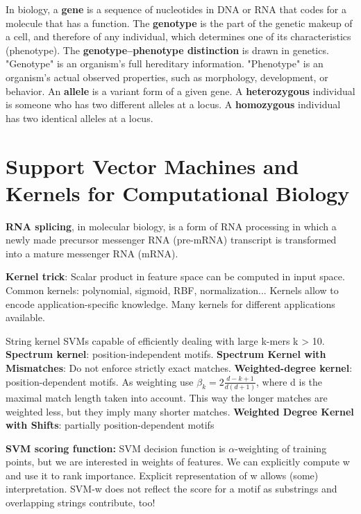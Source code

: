 \documentclass[11pt]{article}
\begin{document}
\par In biology, a \textbf{gene} is a sequence of nucleotides in DNA or RNA that codes for a molecule that has a function. The \textbf{genotype} is the part of the genetic makeup of a cell, and therefore of any individual, which determines one of its characteristics (phenotype). The \textbf{genotype–phenotype distinction} is drawn in genetics. "Genotype" is an organism's full hereditary information. "Phenotype" is an organism's actual observed properties, such as morphology, development, or behavior. An \textbf{allele} is a variant form of a given gene. A \textbf{heterozygous} individual is someone who has two different alleles at a locus. A \textbf{homozygous} individual has two identical alleles at a locus.

\section{Support Vector Machines and Kernels for Computational Biology}
\par \textbf{RNA splicing}, in molecular biology, is a form of RNA processing in which a newly made precursor messenger RNA (pre-mRNA) transcript is transformed into a mature messenger RNA (mRNA).
\par \textbf{Kernel trick}: Scalar product in feature space can be computed in input space. Common kernels: polynomial, sigmoid, RBF, normalization... Kernels allow to encode application-specific knowledge. Many kernels for different applications available.
\par String kernel SVMs capable of efficiently dealing with large k-mers k > 10.
\\
\textbf{Spectrum kernel}: position-independent motifs. \textbf{Spectrum Kernel with Mismatches}: Do not enforce strictly exact matches. \textbf{Weighted-degree kernel}: position-dependent motifs. As weighting use $\beta_k = 2\frac{d-k+1}{d(d+1)}$, where d is the maximal match length taken into account. This way the longer matches are weighted less, but they imply many shorter matches. \textbf{Weighted Degree Kernel with Shifts}: partially position-dependent motifs
\par \textbf{SVM scoring function:} SVM decision function is $\alpha$-weighting of training points, but we are interested in weights of features. We can explicitly compute w and use it to rank importance. Explicit representation of w allows (some) interpretation. SVM-w does not reflect the score for a motif as substrings and overlapping strings contribute, too!
\end{document}
